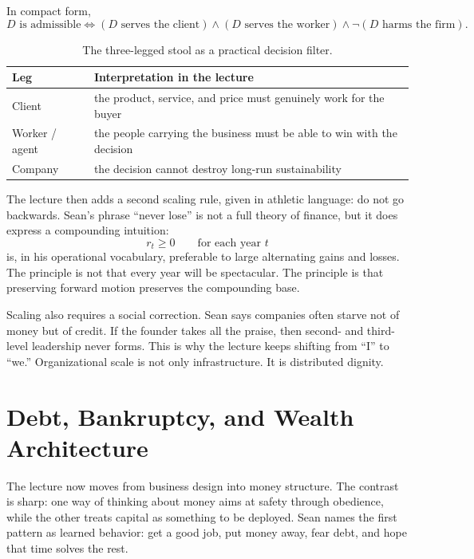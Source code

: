 In compact form,
\begin{equation}
D \text{ is admissible} \iff (D \text{ serves the client}) \land (D \text{ serves the worker}) \land \neg(D \text{ harms the firm}).
\end{equation}

\begin{table}[h]
\centering
\begin{tabular}{|l|p{8.2cm}|}
\hline
Leg & Interpretation in the lecture \\
\hline
Client & the product, service, and price must genuinely work for the buyer \\
\hline
Worker / agent & the people carrying the business must be able to win with the decision \\
\hline
Company & the decision cannot destroy long-run sustainability \\
\hline
\end{tabular}
\caption{The three-legged stool as a practical decision filter.}
\end{table}

The lecture then adds a second scaling rule, given in athletic language: do not go backwards. Sean's phrase ``never lose'' is not a full theory of finance, but it does express a compounding intuition:
\begin{equation}
r_t \ge 0 \qquad \text{for each year } t
\end{equation}
is, in his operational vocabulary, preferable to large alternating gains and losses. The principle is not that every year will be spectacular. The principle is that preserving forward motion preserves the compounding base.

Scaling also requires a social correction. Sean says companies often starve not of money but of credit. If the founder takes all the praise, then second- and third-level leadership never forms. This is why the lecture keeps shifting from ``I'' to ``we.'' Organizational scale is not only infrastructure. It is distributed dignity.

\section{Debt, Bankruptcy, and Wealth Architecture}

The lecture now moves from business design into money structure. The contrast is sharp: one way of thinking about money aims at safety through obedience, while the other treats capital as something to be deployed. Sean names the first pattern as learned behavior: get a good job, put money away, fear debt, and hope that time solves the rest.

